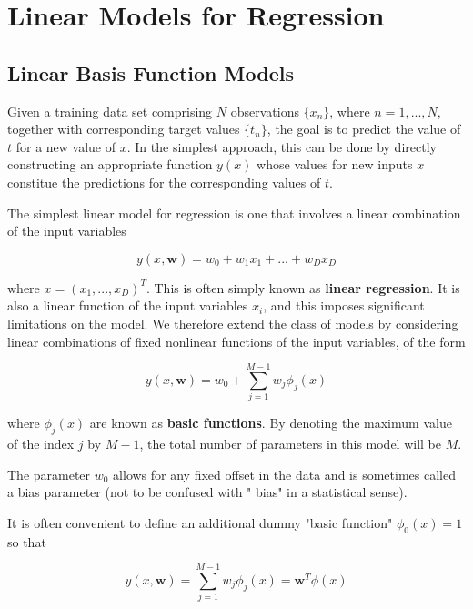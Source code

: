 \chapter{Linear Models for Regression}

\section{Linear Basis Function Models}

Given a training data set comprising $N$ observations $\{x_n\}$, where $n=1, ..., N$, together with corresponding target values $\{t_n\}$, the goal is to predict the value of $t$ for a new value of $x$. In the simplest approach, this can be done by directly constructing an appropriate function $y(x)$ whose values for new inputs $x$ constitue the predictions for the corresponding values of $t$.

The simplest linear model for regression is one that involves a linear combination of the input variables

\begin{equation}
    y(x, \pmb{w}) = w_0 + w_1x_1 + ... + w_Dx_D
\end{equation}

where $x = (x_1, ..., x_D)^T$. This is often simply known as \textbf{linear regression}. It is also a linear function of the input variables $x_i$, and this imposes significant limitations on the model. We therefore extend the class of models by considering linear combinations of fixed nonlinear functions of the input variables, of the form

\begin{equation}
    y(x, \pmb{w}) = w_0 + \sum_{j=1}^{M - 1}w_j \phi_j (x)
\end{equation}

where $\phi_j(x)$ are known as \textbf{basic functions}. By denoting the maximum value of the index $j$ by $M - 1$, the total number of parameters in this model will be $M$.

The parameter $w_0$ allows for any fixed offset in the data and is sometimes called a bias parameter (not to be confused with " bias" in a statistical sense).

It is often convenient to define an additional dummy "basic function" $\phi_0 (x) = 1$ so that

\begin{equation}
    y(x, \pmb{w}) = \sum_{j=1}^{M - 1}w_j \phi_j (x) = \pmb{w}^T \phi (x)
\end{equation}

